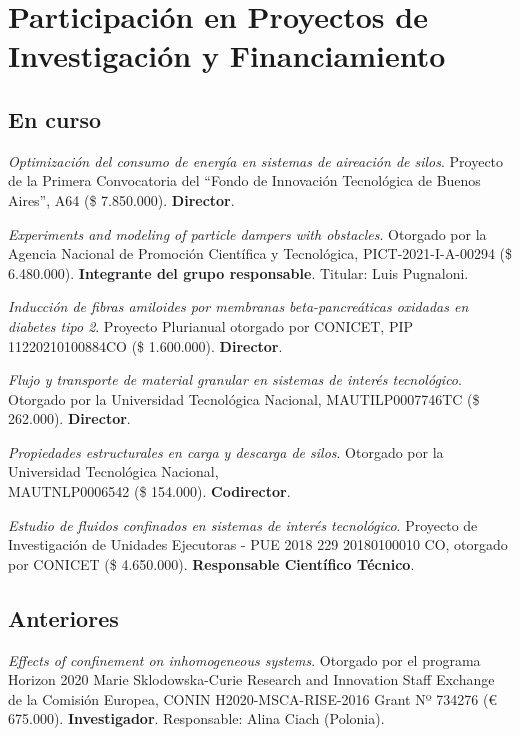 \section{Participación en Proyectos de Investigación y Financiamiento}
\subsection{En curso}

 \textit{Optimización del consumo de energía en sistemas de aireación de silos}. Proyecto de la Primera Convocatoria del ``Fondo de Innovación Tecnológica de Buenos Aires'', A64 (\$ 7.850.000). \textbf{Director}.

 \textit{Experiments and modeling of particle dampers with obstacles}. Otorgado por la Agencia Nacional de Promoción Científica y Tecnológica, PICT-2021-I-A-00294 (\$ 6.480.000). \textbf{Integrante del grupo responsable}. Titular: Luis Pugnaloni.

 \textit{Inducción de fibras amiloides por membranas beta-pancreáticas oxidadas en diabetes tipo 2}. Proyecto Plurianual otorgado por CONICET, PIP 11220210100884CO (\$ 1.600.000). \textbf{Director}.

 \textit{Flujo y transporte de material granular en sistemas de interés tecnológico}. Otorgado por la Universidad Tecnológica Nacional, MAUTILP0007746TC (\$ 262.000). \textbf{Director}.

 \textit{Propiedades estructurales en carga y descarga de silos}. Otorgado por la Universidad Tecnológica Nacional,\\ MAUTNLP0006542 (\$ 154.000). \textbf{Codirector}.

 \textit{Estudio de fluidos confinados en sistemas de interés tecnológico}. Proyecto de Investigación de Unidades Ejecutoras - PUE 2018 229 20180100010 CO, otorgado por CONICET (\$ 4.650.000). \textbf{Responsable Científico Técnico}.


\subsection{Anteriores}

 \textit{Effects of confinement on inhomogeneous systems}. Otorgado por el programa Horizon 2020 Marie Sklodowska-Curie Research and Innovation Staff Exchange de la Comisión Europea, CONIN H2020-MSCA-RISE-2016 Grant Nº 734276 (€ 675.000). \textbf{Investigador}. Responsable: Alina Ciach (Polonia).

